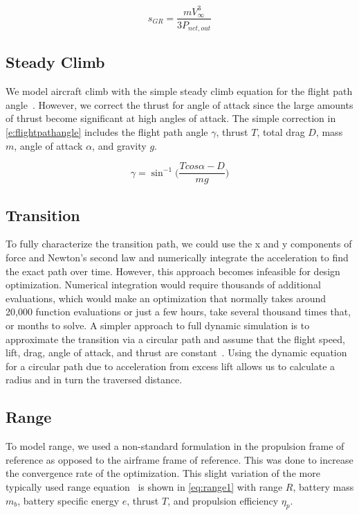 \documentclass[conf]{new-aiaa}
\begin{document}
\begin{equation}
    \label{e:GR}
    s_{GR} = \frac{m V_{\infty}^3}{3P_{net,out}}
\end{equation}

\subsection{Steady Climb}

We model aircraft climb with the simple steady climb equation for the flight path angle~\cite{Anderson:aa}. However, we correct the thrust for angle of attack since the large amounts of thrust become significant at high angles of attack. The simple correction in \cref{e:flightpathangle} includes the flight path angle $\gamma$, thrust $T$, total drag $D$, mass $m$, angle of attack $\alpha$, and gravity $g$.

\begin{equation}
    \label{e:flightpathangle}
    \gamma = \sin^{-1}\Bigg(\frac{T cos{\alpha} - D}{m g}\Bigg)
\end{equation}


\subsection{Transition}


To fully characterize the transition path, we could use the x and y components of force and Newton's second law and numerically integrate the acceleration to find the exact path over time. However, this approach becomes infeasible for design optimization. Numerical integration would require thousands of additional evaluations, which would make an optimization that normally takes around 20,000 function evaluations or just a few hours, take several thousand times that, or months to solve. A simpler approach to full dynamic simulation is to approximate the transition via a circular path and assume that the flight speed, lift, drag, angle of attack, and thrust are constant~\cite{Mair:aa}. Using the dynamic equation for a circular path due to acceleration from excess lift allows us to calculate a radius and in turn the traversed distance.

\subsection{Range}


To model range, we used a non-standard formulation in the propulsion frame of reference as opposed to the airframe frame of reference. This was done to increase the convergence rate of the optimization. This slight variation of the more typically used range equation~\cite{Anderson:2015aa} is shown in \cref{eq:range1} with range $R$, battery mass $m_b$, battery specific energy $e$, thrust $T$, and propulsion efficiency $\eta_{p}$.
\end{document}
